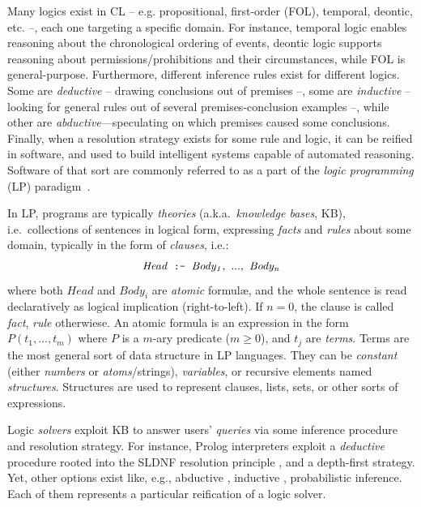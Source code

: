 \documentclass[12pt,a4paper,openright,twoside]{book}
\begin{document}
Many logics exist in CL -- e.g. propositional, first-order (FOL), temporal, deontic, etc. --, each one targeting a specific domain.
%
For instance, temporal logic enables reasoning about the chronological ordering of events, deontic logic supports reasoning about permissions/prohibitions and their circumstances, while FOL is general-purpose.
%
Furthermore, different inference rules exist for different logics.
%
Some are \emph{deductive} -- drawing conclusions out of premises --, some are \emph{inductive} -- looking for general rules out of several premises-conclusion examples --, while other are \emph{abductive}---speculating on which premises caused some conclusions.
%
Finally, when a resolution strategy exists for some rule and logic, %
it can be reified in software, and used to build intelligent systems capable of automated reasoning.
%
Software of that sort are commonly referred to as a part of the \emph{logic programming} (LP) paradigm~\cite{Nerode1996}.

In LP, programs are typically \emph{theories} (a.k.a.\ \emph{knowledge bases}, KB), i.e.\ collections of sentences in logical form, expressing \emph{facts} and \emph{rules} about some domain, typically in the form of \emph{clauses}, i.e.:
\[ \mathit{Head} \impliedBy \mathit{Body_1},\ ...,\ \mathit{Body_n} \]%
where both $\mathit{Head}$ and $\mathit{Body_i}$ are \emph{atomic} formul\ae{}, and the whole sentence is read declaratively as logical implication (right-to-left).
%
If $n = 0$, the clause is called \emph{fact}, \emph{rule} otherwiese.
%
An atomic formula is an expression in the form $P(t_1,...,t_m)$ where $P$ is a $m$-ary predicate ($m \geq 0$), and $t_j$ are \emph{terms}.
%
Terms are the most general sort of data structure in LP languages.
%
They can be \emph{constant} (either \emph{numbers} or \emph{atoms}/strings), \emph{variables}, or recursive elements named \emph{structures}.
%
Structures are used to represent clauses, lists, sets, or other sorts of expressions.

Logic \emph{solvers} exploit KB to answer users' \emph{queries} via some inference procedure and resolution strategy.
%
For instance, Prolog interpreters exploit a \emph{deductive} procedure rooted into the SLDNF resolution principle \cite{Kowalski1974, Clark77}, and a depth-first strategy.
%
Yet, other options exist like, e.g., abductive \cite{FungIff97}, inductive \cite{Muggleton94}, probabilistic \cite{RaedtK15} inference.
%
Each of them represents a particular reification of a logic solver.
\end{document}
